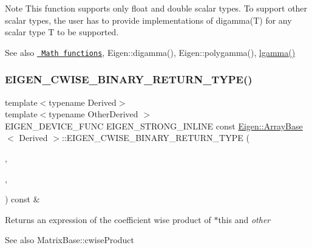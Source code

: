 \begin{DoxyNote}{Note}
This function supports only float and double scalar types. To support other scalar types, the user has to provide implementations of digamma(\+T) for any scalar type T to be supported.
\end{DoxyNote}
\begin{DoxySeeAlso}{See also}
\href{group__CoeffwiseMathFunctions.html\#cwisetable_digamma}{\texttt{ Math functions}}, Eigen\+::digamma(), Eigen\+::polygamma(), \mbox{\hyperlink{class_eigen_1_1_array_base_aaacc294090a265da0dc695737750dd28}{lgamma()}} 
\end{DoxySeeAlso}
\mbox{\label{class_eigen_1_1_array_base_a963e061904b3a156d8b598b22b0c9f00}} 
\subsubsection{\texorpdfstring{EIGEN\_CWISE\_BINARY\_RETURN\_TYPE()}{EIGEN\_CWISE\_BINARY\_RETURN\_TYPE()}\hspace{0.1cm}{\footnotesize\ttfamily [1/2]}}
{\footnotesize\ttfamily template$<$typename Derived$>$ \\
template$<$typename Other\+Derived $>$ \\
E\+I\+G\+E\+N\+\_\+\+D\+E\+V\+I\+C\+E\+\_\+\+F\+U\+NC E\+I\+G\+E\+N\+\_\+\+S\+T\+R\+O\+N\+G\+\_\+\+I\+N\+L\+I\+NE const \mbox{\hyperlink{class_eigen_1_1_array_base}{Eigen\+::\+Array\+Base}}$<$ Derived $>$\+::E\+I\+G\+E\+N\+\_\+\+C\+W\+I\+S\+E\+\_\+\+B\+I\+N\+A\+R\+Y\+\_\+\+R\+E\+T\+U\+R\+N\+\_\+\+T\+Y\+PE (\begin{DoxyParamCaption}\item[{Derived}]{,  }\item[{Other\+Derived}]{,  }\item[{product}]{ }\end{DoxyParamCaption}) const \&\hspace{0.3cm}{\ttfamily [inline]}}

\begin{DoxyReturn}{Returns}
an expression of the coefficient wise product of {\ttfamily $\ast$this} and {\itshape other} 
\end{DoxyReturn}
\begin{DoxySeeAlso}{See also}
Matrix\+Base\+::cwise\+Product 
\end{DoxySeeAlso}
\mbox{\label{class_eigen_1_1_array_base_a8d6fa230936f9b87bc720b5c802fbf35}} 

